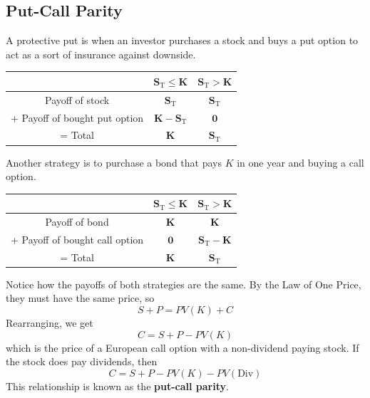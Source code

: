\documentclass[11pt]{article}
\theoremstyle{definition}
\begin{document}
\subsection{Put-Call Parity}
A protective put is when an investor purchases a stock and buys a put option to act as a sort of insurance against downside. 
\begin{center}
\begin{tabular}{ccc} 
& $\mathbf{S}_{\mathrm{T}} \leq \mathbf{K}$ & $\mathbf{S}_{\mathrm{T}}>\mathbf{K}$ \\
\hline 
Payoff of stock & $\mathbf{S}_{\mathrm{T}}$ & $\mathbf{S}_{\mathrm{T}}$ \\
+ Payoff of bought put option & $\mathbf{K}-\mathbf{S}_{\mathrm{T}}$ & $\mathbf{0}$ \\
\hline
= Total & $\mathbf{K}$ & $\mathbf{S}_{\mathrm{T}}$
\end{tabular}
\end{center}
Another strategy is to purchase a bond that pays $K$ in one year and buying a call option.
\begin{center}
\begin{tabular}{ccc} 
& $\mathbf{S}_{\mathrm{T}} \leq \mathbf{K}$ & $\mathbf{S}_{\mathrm{T}}>\mathbf{K}$ \\
\hline 
Payoff of bond & $\mathbf{K}$ & $\mathbf{K}$ \\
+ Payoff of bought call option & $\mathbf{0}$ & $\mathbf{S}_{\mathrm{T}}-\mathbf{K}$ \\
\hline
= Total & $\mathbf{K}$ & $\mathbf{S}_{\mathrm{T}}$
\end{tabular}
\end{center}
Notice how the payoffs of both strategies are the same. By the Law of One Price, they must have the same price, so 
\begin{equation*}
    S + P  = PV(K) + C
\end{equation*}
Rearranging, we get 
\begin{equation*}
    C = S + P - PV(K)
\end{equation*}
which is the price of a European call option with a non-dividend paying stock. If the stock does pay dividends, then 
\begin{equation*}
    C = S + P - PV(K) - PV(\text{Div})
\end{equation*}
This relationship is known as the \textbf{put-call parity}.
\end{document}

